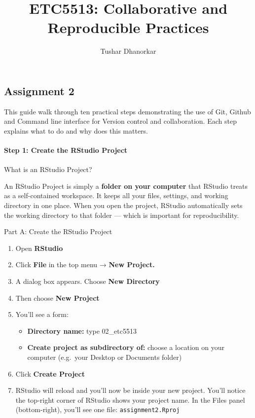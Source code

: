 \documentclass[
  letterpaper,
  DIV=11,
  numbers=noendperiod]{scrartcl}
\title{ETC5513: Collaborative and Reproducible Practices}
\author{Tushar Dhanorkar}
\date{}
\makeatletter
\let\oldparagraph\paragraph
\renewcommand{\paragraph}{
    \@ifstar
      \xxxParagraphStar
      \xxxParagraphNoStar
  }
\newcommand{\xxxParagraphStar}[1]{\oldparagraph*{#1}\mbox{}}
\newcommand{\xxxParagraphNoStar}[1]{\oldparagraph{#1}\mbox{}}
\makeatother
\begin{document}
\maketitle


\subsection{Assignment 2}\label{assignment-2}

This guide walk through ten practical steps demonstrating the use of
Git, Github and Command line interface for Version control and
collaboration. Each step explains what to do and why does this matters.

\paragraph{\texorpdfstring{\textbf{Step 1: Create the RStudio
Project}}{Step 1: Create the RStudio Project}}\label{step-1-create-the-rstudio-project}

\paragraph{What is an RStudio
Project?}\label{what-is-an-rstudio-project}

An RStudio Project is simply a \textbf{folder on your computer} that
RStudio treats as a self-contained workspace. It keeps all your files,
settings, and working directory in one place. When you open the project,
RStudio automatically sets the working directory to that folder ---
which is important for reproducibility.

Part A: Create the RStudio Project

\begin{enumerate}
\def\labelenumi{\arabic{enumi}.}
\item
  Open \textbf{RStudio}
\item
  Click \textbf{File} in the top menu → \textbf{New Project.}
\item
  A dialog box appears. Choose \textbf{New Directory}
\item
  Then choose \textbf{New Project}
\item
  You'll see a form:

  \begin{itemize}
  \item
    \textbf{Directory name:} type 02\_etc5513
  \item
    \textbf{Create project as subdirectory of:} choose a location on
    your computer (e.g.~your Desktop or Documents folder)
  \end{itemize}
\item
  Click \textbf{Create Project}
\item
  RStudio will reload and you'll now be inside your new project. You'll
  notice the top-right corner of RStudio shows your project name. In the
  Files panel (bottom-right), you'll see one file:
  \texttt{assignment2.Rproj}
\end{enumerate}
\end{document}

